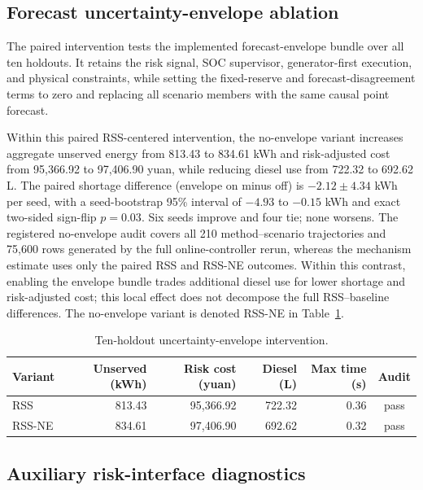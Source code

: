 \subsection{Forecast uncertainty-envelope
ablation}\label{forecast-uncertainty-envelope-ablation}

The paired intervention tests the implemented forecast-envelope bundle over all
ten holdouts. It retains the risk signal, SOC supervisor, generator-first
execution, and physical constraints, while setting the fixed-reserve and
forecast-disagreement terms to zero and replacing all scenario members with the
same causal point forecast.

Within this paired RSS-centered intervention, the no-envelope variant increases
aggregate unserved energy from 813.43 to 834.61 kWh and risk-adjusted cost from
95,366.92 to 97,406.90 yuan, while reducing diesel use from 722.32 to 692.62 L.
The paired shortage difference (envelope on minus off) is $-2.12\pm4.34$ kWh
per seed, with a seed-bootstrap 95\% interval of $-4.93$ to $-0.15$ kWh and
exact two-sided sign-flip $p=0.03$. Six seeds improve and four tie; none worsens.
The registered no-envelope audit covers all 210 method--scenario trajectories
and 75,600 rows generated by the full online-controller rerun, whereas the
mechanism estimate uses only the paired RSS and RSS-NE outcomes. Within this
contrast, enabling the envelope bundle trades additional diesel use for lower
shortage and risk-adjusted cost; this local effect does not decompose the full
RSS--baseline differences. The no-envelope variant is denoted RSS-NE in
Table~\ref{tab:uncertainty-envelope-intervention}.

\begin{table}[!t]
\caption{Ten-holdout uncertainty-envelope intervention.}
\label{tab:uncertainty-envelope-intervention}
\centering
\footnotesize
\begin{tabular}{lrrrrc}
\toprule
Variant & Unserved (kWh) & Risk cost (yuan) & Diesel (L) & Max time (s) & Audit \\
\midrule
RSS & 813.43 & 95,366.92 & 722.32 & 0.36 & pass \\
RSS-NE & 834.61 & 97,406.90 & 692.62 & 0.32 & pass \\
\bottomrule
\end{tabular}
\end{table}

\subsection{Auxiliary risk-interface
diagnostics}\label{auxiliary-risk-interface-diagnostics}

